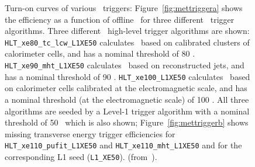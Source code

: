 				\begin{figure}[!htb]
					\centering
					\caption{Turn-on curves of various \met\ triggers: Figure~\ref{fig:mettriggera} shows the efficiency as a function of offline \met\ for three different \met\ trigger algorithms. Three different \met\ high-level trigger algorithms are shown: \texttt{HLT\_xe80\_tc\_lcw\_L1XE50} calculates \met\ based on calibrated clusters of calorimeter cells, and has a nominal threshold of 80 \GeV. \texttt{HLT\_xe90\_mht\_L1XE50} calculates \met\ based on reconstructed jets, and has a nominal threshold of 90 \GeV. \texttt{HLT\_xe100\_L1XE50} calculates \met\ based on calorimeter cells calibrated at the electromagnetic scale, and has a nominal threshold (at the electromagnetic scale) of 100 \GeV. All three algorithms are seeded by a Level-1 trigger algorithm with a nominal threshold of 50 \GeV\ which is also shown; Figure~\ref{fig:mettriggerb} shows missing transverse energy trigger efficiencies for \texttt{HLT\_xe110\_pufit\_L1XE50} and \texttt{HLT\_xe110\_mht\_L1XE50} and for the corresponding \ac{L1} seed (\texttt{L1\_XE50}). (from~\cite{ATLASMETTriggerPublicPage}).}
					\label{fig:mettrigger}
				\end{figure}
